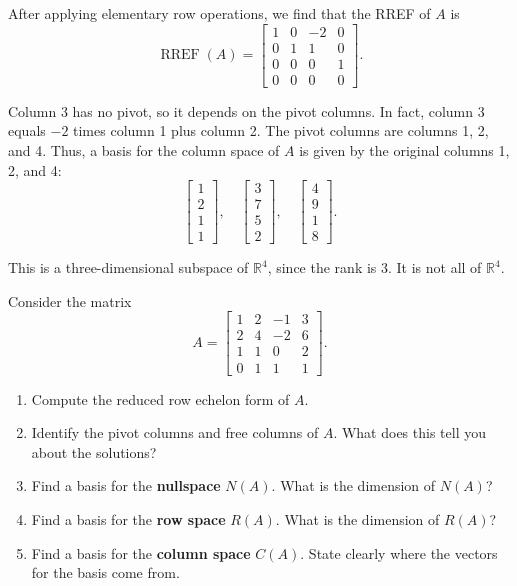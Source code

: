 After applying elementary row operations, we find that the RREF of $A$ is
\[
\operatorname{RREF}(A) =
\begin{bmatrix}
1 & 0 & -2 & 0 \\
0 & 1 & 1 & 0 \\
0 & 0 & 0 & 1 \\
0 & 0 & 0 & 0
\end{bmatrix}.
\]

Column 3 has no pivot, so it depends on the pivot columns. In fact, column 3 equals $-2$ times column 1 plus column 2.  
The pivot columns are columns 1, 2, and 4.  
Thus, a basis for the column space of $A$ is given by the original columns 1, 2, and 4:
\[
\begin{bmatrix}
1 \\ 2 \\ 1 \\ 1
\end{bmatrix},
\quad
\begin{bmatrix}
3 \\ 7 \\ 5 \\ 2
\end{bmatrix},
\quad
\begin{bmatrix}
4 \\ 9 \\ 1 \\ 8
\end{bmatrix}.
\]

This is a three-dimensional subspace of $\mathbb{R}^4$, since the rank is 3. It is not all of $\mathbb{R}^4$.

\begin{Exercise}[title={Nullspace, Rowspace, and Columnspace}, label={ex:bigprob}]

Consider the matrix
\[
A=
\begin{bmatrix}
1 & 2 & -1 & 3\\
2 & 4 & -2 & 6\\
1 & 1 & 0 & 2\\
0 & 1 & 1 & 1
\end{bmatrix}.
\]

\begin{enumerate}[label=\alph*]
\item Compute the reduced row echelon form of \(A\).
\item Identify the pivot columns and free columns of \(A\). What does this tell you about the solutions?
\item Find a basis for the \textbf{nullspace} \( N(A)\). What is the dimension of \( N(A)\)?
\item Find a basis for the \textbf{row space} \( R(A)\). What is the dimension of \( R(A)\)?
\item Find a basis for the \textbf{column space} \( C(A)\). State clearly where the vectors for the basis come from.
\end{enumerate}

\end{Exercise}


